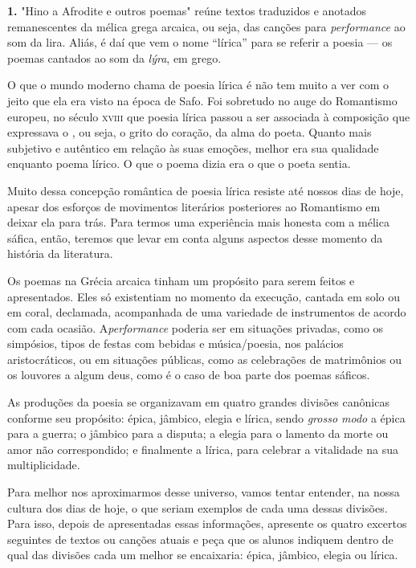 \documentclass[12pt]{extarticle}
\begin{document}
\textbf{1.}
"Hino a Afrodite e outros poemas" reúne textos traduzidos e anotados remanescentes
da mélica grega arcaica, ou seja, das canções para \textit{performance} 
ao som da lira. Aliás, é daí que vem o nome ``lírica'' para se referir 
a poesia --- os poemas cantados ao som da \textit{lýra}, em grego.

O que o mundo moderno chama de poesia lírica é não tem muito a ver com
o jeito que ela era visto na época de Safo. Foi sobretudo no auge do
Romantismo europeu, no século \textsc{xviii} que poesia lírica passou a ser
associada à composição que expressava o , ou seja,
o grito do coração, da alma do poeta. Quanto mais subjetivo e autêntico
em relação às suas emoções, melhor era sua qualidade enquanto poema
lírico. O que o poema dizia era o que o poeta sentia. 

Muito dessa concepção romântica de poesia lírica resiste até nossos dias
de hoje, apesar dos esforços de movimentos literários posteriores ao Romantismo
em deixar ela para trás. Para termos uma experiência mais honesta com a mélica 
sáfica, então, teremos que levar em conta alguns aspectos desse momento da 
história da literatura.

Os poemas na Grécia arcaica tinham um propósito para serem feitos e apresentados. 
Eles só existentiam no momento da execução, cantada em solo ou em coral, declamada,
acompanhada de uma variedade de instrumentos de acordo com cada ocasião. 
A\textit{performance} poderia ser em situações privadas, como os simpósios, tipos 
de festas com bebidas e música/poesia, nos palácios aristocráticos, ou em situações 
públicas, como as celebrações de matrimônios ou os louvores a algum deus, como é o
caso de boa parte dos poemas sáficos. 

As produções da poesia se organizavam em quatro grandes divisões canônicas conforme
seu propósito: épica, jâmbico, elegia e lírica, sendo \emph{grosso modo} a épica 
para a guerra; o jâmbico para a disputa; a elegia para o lamento da morte ou amor 
não correspondido; e finalmente a lírica, para celebrar a vitalidade na sua multiplicidade.

Para melhor nos aproximarmos desse universo, vamos tentar entender, na nossa 
cultura dos dias de hoje, o que seriam exemplos de cada uma dessas divisões.
Para isso, depois de apresentadas essas informações, apresente os quatro excertos 
seguintes de textos ou canções atuais e peça que os alunos indiquem dentro de 
qual das divisões cada um melhor se encaixaria: épica, jâmbico, elegia ou lírica. 
\end{document}
